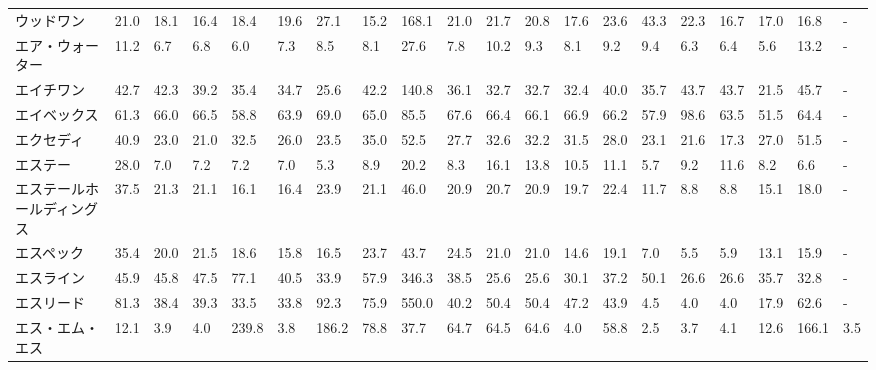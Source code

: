 \begin{tabular}{llllllllllllllllllll}
ウッドワン           &   21.0 &   18.1 &      16.4 &      18.4 &       19.6 &    27.1 &    15.2 &    168.1 &    21.0 &    21.7 &   20.8 &   17.6 &    23.6 &    43.3 &    22.3 &   16.7 &   17.0 &    16.8 &      - \\
エア・ウォーター        &   11.2 &    6.7 &       6.8 &       6.0 &        7.3 &     8.5 &     8.1 &     27.6 &     7.8 &    10.2 &    9.3 &    8.1 &     9.2 &     9.4 &     6.3 &    6.4 &    5.6 &    13.2 &      - \\
エイチワン           &   42.7 &   42.3 &      39.2 &      35.4 &       34.7 &    25.6 &    42.2 &    140.8 &    36.1 &    32.7 &   32.7 &   32.4 &    40.0 &    35.7 &    43.7 &   43.7 &   21.5 &    45.7 &      - \\
エイベックス          &   61.3 &   66.0 &      66.5 &      58.8 &       63.9 &    69.0 &    65.0 &     85.5 &    67.6 &    66.4 &   66.1 &   66.9 &    66.2 &    57.9 &    98.6 &   63.5 &   51.5 &    64.4 &      - \\
エクセディ           &   40.9 &   23.0 &      21.0 &      32.5 &       26.0 &    23.5 &    35.0 &     52.5 &    27.7 &    32.6 &   32.2 &   31.5 &    28.0 &    23.1 &    21.6 &   17.3 &   27.0 &    51.5 &      - \\
エステー            &   28.0 &    7.0 &       7.2 &       7.2 &        7.0 &     5.3 &     8.9 &     20.2 &     8.3 &    16.1 &   13.8 &   10.5 &    11.1 &     5.7 &     9.2 &   11.6 &    8.2 &     6.6 &      - \\
エステールホールディングス   &   37.5 &   21.3 &      21.1 &      16.1 &       16.4 &    23.9 &    21.1 &     46.0 &    20.9 &    20.7 &   20.9 &   19.7 &    22.4 &    11.7 &     8.8 &    8.8 &   15.1 &    18.0 &      - \\
エスペック           &   35.4 &   20.0 &      21.5 &      18.6 &       15.8 &    16.5 &    23.7 &     43.7 &    24.5 &    21.0 &   21.0 &   14.6 &    19.1 &     7.0 &     5.5 &    5.9 &   13.1 &    15.9 &      - \\
エスライン           &   45.9 &   45.8 &      47.5 &      77.1 &       40.5 &    33.9 &    57.9 &    346.3 &    38.5 &    25.6 &   25.6 &   30.1 &    37.2 &    50.1 &    26.6 &   26.6 &   35.7 &    32.8 &      - \\
エスリード           &   81.3 &   38.4 &      39.3 &      33.5 &       33.8 &    92.3 &    75.9 &    550.0 &    40.2 &    50.4 &   50.4 &   47.2 &    43.9 &     4.5 &     4.0 &    4.0 &   17.9 &    62.6 &      - \\
エス・エム・エス        &   12.1 &    3.9 &       4.0 &     239.8 &        3.8 &   186.2 &    78.8 &     37.7 &    64.7 &    64.5 &   64.6 &    4.0 &    58.8 &     2.5 &     3.7 &    4.1 &   12.6 &   166.1 &    3.5 \\

\end{tabular}
